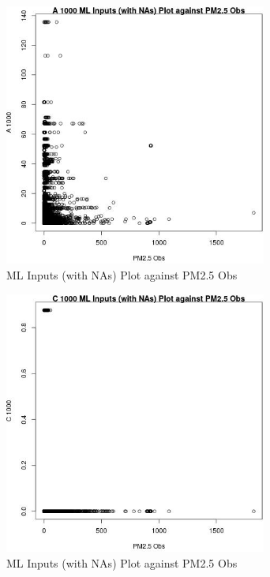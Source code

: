 \begin{figure} 
\centering  
\includegraphics[width=0.77\textwidth]{Code_Outputs/Report_ML_input_PM25_Step4_part_e_de_duplicated_aveswNAs_A_1000vPM25_Obs.jpg} 
\caption{\label{fig:Report_ML_input_PM25_Step4_part_e_de_duplicated_aveswNAsA_1000vPM25_Obs}ML Inputs (with NAs) Plot against PM2.5 Obs} 
\end{figure} 
 

\begin{figure} 
\centering  
\includegraphics[width=0.77\textwidth]{Code_Outputs/Report_ML_input_PM25_Step4_part_e_de_duplicated_aveswNAs_C_1000vPM25_Obs.jpg} 
\caption{\label{fig:Report_ML_input_PM25_Step4_part_e_de_duplicated_aveswNAsC_1000vPM25_Obs}ML Inputs (with NAs) Plot against PM2.5 Obs} 
\end{figure} 
 

